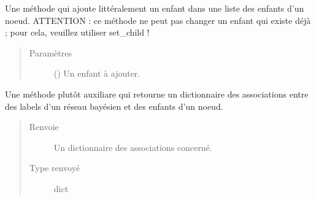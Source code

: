 \documentclass[letterpaper,10pt,french]{sphinxmanual}
\begin{document}
\begin{fulllineitems}
\begin{fulllineitems}
\begin{quote}
\begin{description}
\end{description}\end{quote}

\end{fulllineitems}


\begin{fulllineitems}
\label{\detokenize{index:StrategyTree.Observation.add_child}}
Une méthode qui ajoute littéralement un enfant dans une liste des enfants d’un noeud.
ATTENTION : ce méthode ne peut pas changer un enfant qui existe déjà ; pour cela, veuillez utiliser set\_child !
\begin{quote}\begin{description}
\item[{Paramètres}] \leavevmode
{} ({\hyperref[\detokenize{index:StrategyTree.NodeST}]{}}) \textendash{} Un enfant à ajouter.

\end{description}\end{quote}

\end{fulllineitems}


\begin{fulllineitems}
\label{\detokenize{index:StrategyTree.Observation.bn_labels_children_association}}
Une méthode plutôt auxiliare qui retourne un dictionnaire des associations entre des labels d’un réseau
bayésien et des enfants d’un noeud.
\begin{quote}\begin{description}
\item[{Renvoie}] \leavevmode
{} \textendash{} Un dictionnaire des associations concerné.

\item[{Type renvoyé}] \leavevmode
dict

\end{description}\end{quote}


\end{fulllineitems}
\end{fulllineitems}
\end{document}
